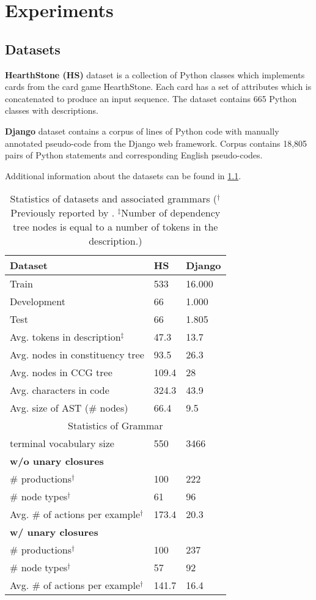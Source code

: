 \chapter{Experiments} \label{Chapter5} 

\section{Datasets}
\textbf{HearthStone (HS)}  dataset \parencite{Ling2016} is a collection of Python classes which implements cards from the card game HearthStone. Each card has a set of attributes which is concatenated to produce an input sequence. The dataset contains 665 Python classes with descriptions.

\textbf{Django} dataset \parencite{Oda2015} contains a corpus of lines of Python code with manually annotated pseudo-code from the Django web framework. Corpus contains 18,805 pairs of Python statements and corresponding English pseudo-codes. 

Additional information about the datasets can be found in \cref{tab:stat}.

\begin{table}
\centering
\begin{tabular}{ l l l }
\hline
\textbf{Dataset} & \textbf{HS} & \textbf{Django} \\
\hline 
Train & 533 & 16.000 \\ 
Development & 66 & 1.000 \\ 
Test & 66 & 1.805 \\ 
\hline
Avg. tokens in description$^\ddagger$ & 47.3 & 13.7 \\
Avg. nodes in constituency tree & 93.5 & 26.3 \\
Avg. nodes in CCG tree & 109.4 & 28 \\
Avg. characters in code & 324.3 & 43.9 \\
Avg. size of AST (\# nodes) & 66.4 & 9.5 \\
 \hline
 \hline
\multicolumn{3}{c}{Statistics of Grammar} \\
terminal vocabulary size & 550 & 3466 \\ 
\hline
\multicolumn{3}{l}{\textbf{w/o unary closures}} \\
\# productions$^\dagger$ & 100 & 222 \\
\# node types$^\dagger$ & 61 & 96 \\
Avg. \# of actions per example$^\dagger$ & 173.4 & 20.3 \\ 
\hline
\multicolumn{3}{l}{\textbf{w/ unary closures}} \\
\# productions$^\dagger$ & 100 & 237 \\
\# node types$^\dagger$ & 57 & 92 \\
Avg. \# of actions per example$^\dagger$ & 141.7 & 16.4 \\ 
\hline
\end{tabular}
\caption[Statistics of datasets]{Statistics of datasets and associated grammars ($^\dagger$Previously reported by \cite{Yin2017}. $^\ddagger$Number of dependency tree nodes is equal to a number of tokens in the description.)}
\label{tab:stat}
\end{table}

